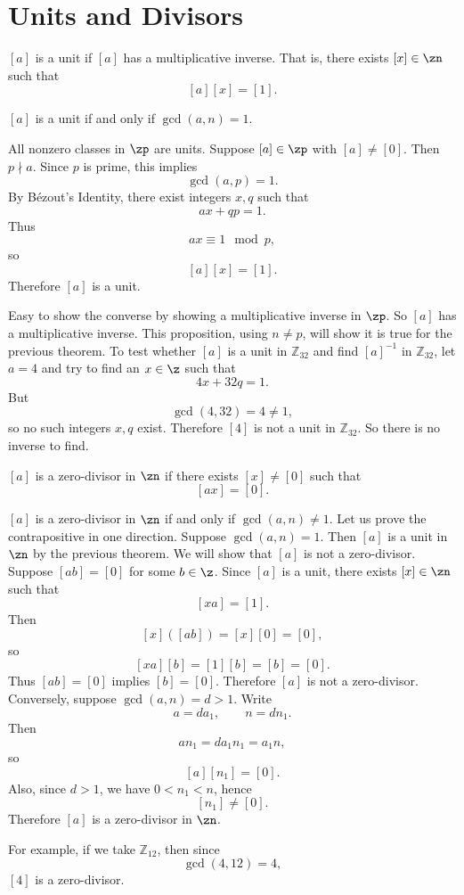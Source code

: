 
\section{Units and Divisors}

\begin{definition}
    $[a]$ is a unit if $[a]$ has a multiplicative inverse.
    That is, there exists $[x]\in \zn$ such that
    \[
        [a][x] = [1].
    \]
\end{definition}

\begin{theorem*}{
    $[a]$ is a unit if and only if $\gcd(a,n) = 1$.
}
\end{theorem*}

\begin{proposition}{
    All nonzero classes in $\zp$ are units.
}
    Suppose $[a]\in\zp$ with $[a]\neq [0]$.
    Then $p\nmid a$.
    Since $p$ is prime, this implies
    \[
        \gcd(a,p) = 1.
    \]
    By Bézout's Identity, there exist integers $x,q$ such that
    \[
        ax + qp = 1.
    \]
    Thus
    \[
        ax \equiv 1 \mod p,
    \]
    so
    \[
        [a][x] = [1].
    \]
    Therefore $[a]$ is a unit.
\end{proposition}

Easy to show the converse by showing a multiplicative inverse in $\zp$.
So $[a]$ has a multiplicative inverse.
This proposition, using $n\neq p$, will show it is true for the previous theorem.
To test whether $[a]$ is a unit in $\mathbb{Z}_{32}$ and find $[a]^{-1}$ in $\mathbb{Z}_{32}$, let $a=4$ and try to find an $x\in\z$ such that
\[
    4x + 32q = 1.
\]
But
\[
    \gcd(4,32) = 4 \neq 1,
\]
so no such integers $x,q$ exist.
Therefore $[4]$ is not a unit in $\mathbb{Z}_{32}$.
So there is no inverse to find.

\begin{definition}
    $[a]$ is a zero-divisor in $\zn$ if there exists $[x]\neq [0]$ such that
    \[
        [ax] = [0].
    \]
\end{definition}

\begin{theorem}{
    $[a]$ is a zero-divisor in $\zn$ if and only if $\gcd(a,n)\neq 1$.
}
Let us prove the contrapositive in one direction.
Suppose $\gcd(a,n) = 1$.
Then $[a]$ is a unit in $\zn$ by the previous theorem.
We will show that $[a]$ is not a zero-divisor.
Suppose $[ab] = [0]$ for some $b\in\z$.
Since $[a]$ is a unit, there exists $[x]\in\zn$ such that
\[
    [xa] = [1].
\]
Then
\[
    [x]([ab]) = [x][0] = [0],
\]
so
\[
    [xa][b] = [1][b] = [b] = [0].
\]
Thus $[ab]=[0]$ implies $[b]=[0]$.
Therefore $[a]$ is not a zero-divisor.
Conversely, suppose $\gcd(a,n) = d > 1$.
Write
\[
    a = da_1, \qquad n = dn_1.
\]
Then
\[
    a n_1 = da_1 n_1 = a_1 n,
\]
so
\[
    [a][n_1] = [0].
\]
Also, since $d>1$, we have $0<n_1<n$, hence
\[
    [n_1]\neq [0].
\]
Therefore $[a]$ is a zero-divisor in $\zn$.
\end{theorem}

For example, if we take $\mathbb{Z}_{12}$, then since
\[
    \gcd(4,12) = 4,
\]
$[4]$ is a zero-divisor.
